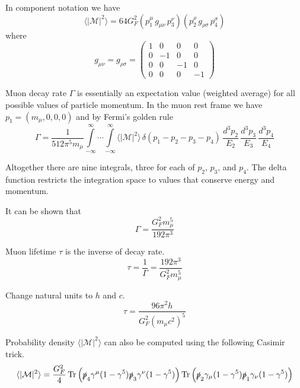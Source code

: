 \documentclass[12pt]{article}
\begin{document}
In component notation we have
\begin{equation*}
\langle|\mathcal{M}|^2\rangle=64G_F^2
(p_1^\mu \, g_{\mu\nu} \, p_3^\nu)
(p_2^\rho \, g_{\rho\sigma} \, p_4^\sigma)
\end{equation*}
where
\begin{equation*}
g_{\mu\nu}=g_{\rho\sigma}=\begin{pmatrix}
1 & 0 & 0 & 0\\
0 & -1 & 0 & 0\\
0 & 0 & -1 & 0\\
0 & 0 & 0 & -1
\end{pmatrix}
\end{equation*}

Muon decay rate $\Gamma$ is essentially an expectation value (weighted average)
for all possible values of particle momentum.
In the muon rest frame we have $p_1=(m_\mu,0,0,0)$ and by Fermi's golden rule
\begin{equation*}
\Gamma=\frac{1}{512\pi^5m_\mu}
\int\limits_{-\infty}^\infty \cdots \int\limits_{-\infty}^\infty
\langle|\mathcal{M}|^2\rangle
\,\delta(p_1-p_2-p_3-p_4)
\,\frac{d^3p_2}{E_2}\,\frac{d^3p_3}{E_3}\,\frac{d^3p_4}{E_4}
\end{equation*}

Altogether there are nine integrals, three for each of $p_2$, $p_3$, and $p_4$.
The delta function restricts the integration space to values that conserve energy and momentum.

\bigskip
It can be shown that
\begin{equation*}
\Gamma=\frac{G_F^2 m_\mu^5}{192\pi^3}
\end{equation*}

Muon lifetime $\tau$ is the inverse of decay rate.
\begin{equation*}
\tau=\frac{1}{\Gamma}=\frac{192\pi^3}{G_F^2 m_\mu^5}
\end{equation*}

Change natural units to $h$ and $c$.
\begin{equation*}
\tau
=\frac{96\pi^2h}{G_F^2\left(m_\mu c^2\right)^5}
\end{equation*}

Probability density $\langle|\mathcal{M}|^2\rangle$ can also be computed
using the following Casimir trick.
\begin{equation*}
\langle|\mathcal{M}|^2\rangle
=\frac{G_F^2}{4}
\mathop{\text{Tr}}
\left(\slashed{p}_4\gamma^\mu(1-\gamma^5)\slashed{p}_3\gamma^\nu(1-\gamma^5)\right)
\mathop{\text{Tr}}
\left(\slashed{p}_2\gamma_\mu(1-\gamma^5)\slashed{p}_1\gamma_\nu(1-\gamma^5)\right)
\end{equation*}
\end{document}
